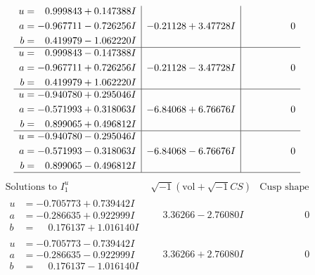 \documentclass[1p]{elsarticle_modified}
\theoremstyle{definition}
\newcommand{\I}{\sqrt{-1}}
\begin{document}
$$\begin{array}{c|c|c}
\begin{aligned}
u &= \phantom{-}0.999843 + 0.147388 I \\
a &= -0.967711 - 0.726256 I \\
b &= \phantom{-}0.419979 - 1.062220 I\end{aligned}
 & -0.21128 + 3.47728 I & \phantom{-0.000000 } 0 \\ \hline\begin{aligned}
u &= \phantom{-}0.999843 - 0.147388 I \\
a &= -0.967711 + 0.726256 I \\
b &= \phantom{-}0.419979 + 1.062220 I\end{aligned}
 & -0.21128 - 3.47728 I & \phantom{-0.000000 } 0 \\ \hline\begin{aligned}
u &= -0.940780 + 0.295046 I \\
a &= -0.571993 + 0.318063 I \\
b &= \phantom{-}0.899065 + 0.496812 I\end{aligned}
 & -6.84068 + 6.76676 I & \phantom{-0.000000 } 0 \\ \hline\begin{aligned}
u &= -0.940780 - 0.295046 I \\
a &= -0.571993 - 0.318063 I \\
b &= \phantom{-}0.899065 - 0.496812 I\end{aligned}
 & -6.84068 - 6.76676 I & \phantom{-0.000000 } 0\\
 \hline 
 \end{array}$$\newpage$$\begin{array}{c|c|c}  
\text{Solutions to }I^u_{1}& \I (\text{vol} + \sqrt{-1}CS) & \text{Cusp shape}\\
 \hline 
\begin{aligned}
u &= -0.705773 + 0.739442 I \\
a &= -0.286635 + 0.922999 I \\
b &= \phantom{-}0.176137 + 1.016140 I\end{aligned}
 & \phantom{-}3.36266 - 2.76080 I & \phantom{-0.000000 } 0 \\ \hline\begin{aligned}
u &= -0.705773 - 0.739442 I \\
a &= -0.286635 - 0.922999 I \\
b &= \phantom{-}0.176137 - 1.016140 I\end{aligned}
 & \phantom{-}3.36266 + 2.76080 I & \phantom{-0.000000 } 0 \\ \hline\begin{aligned}

\end{aligned}
\end{array}$$
\end{document}
